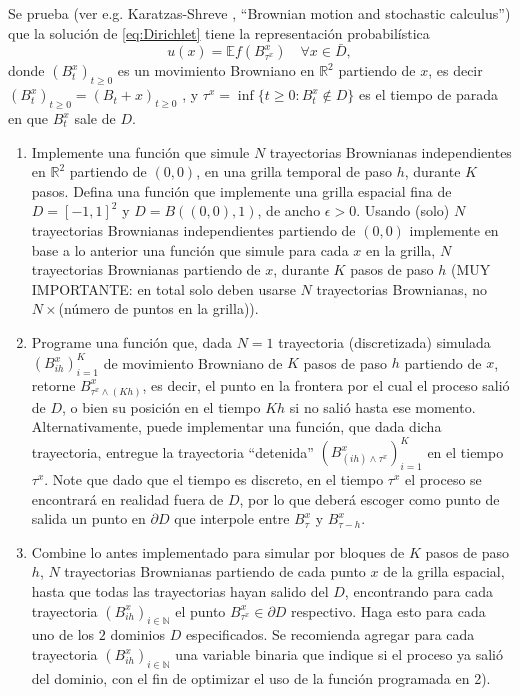 Se prueba (ver e.g. Karatzas-Shreve , ``Brownian motion and stochastic calculus'')  que la solución de \eqref{eq:Dirichlet} tiene la  representaci\'on probabilística 
\begin{equation}
\label{eq:u}
u(x) = \mathbb{E} f(B^x_{\tau^x}) \quad \forall x\in \bar{D},
\end{equation}
donde $(B^x_t)_{t\geq 0}$ es un movimiento Browniano en $\mathbb{R}^2$ partiendo de $x$,  es decir $(B^x_t)_{t\geq 0} = (B_t+x)_{t\geq 0}$ , y  $\tau^x = \inf\{t\geq 0: B^x_t \notin D\}$ es el tiempo de parada en que $B^x_t$  sale de $D$. 
\begin{enumerate}
\item Implemente una funci\'on que simule $N$ trayectorias Brownianas independientes en $\mathbb{R}^2$ partiendo de $(0,0)$, en una grilla temporal de paso $h$, durante $K$ pasos. Defina una  funci\'on que implemente una grilla espacial fina de $D=[-1,1]^2$ y $D=B((0,0), 1)$, de ancho $\epsilon>0$. Usando (solo) $N$ trayectorias  Brownianas  independientes partiendo  de $(0,0)$    implemente en base a lo anterior una funci\'on que  simule  para cada $x$ en la grilla, $N$  trayectorias Brownianas partiendo de  $x$, durante $K$ pasos  de paso $h$ (MUY IMPORTANTE:  en total solo deben usarse $N$ trayectorias Brownianas, no $N\times $(n\'umero de puntos en la grilla)). 

\item Programe una funci\'on que, dada $N=1$ trayectoria (discretizada)  simulada  $(B^x_{ih})_{i=1}^K$ de movimiento Browniano de $K$ pasos de paso $h$ partiendo de $x$, retorne $B^x_{\tau^x \wedge (Kh)}$, es decir,  el punto  en la frontera por el cual el proceso sali\'o  de $D$, o bien su posici\'on en el tiempo $Kh$ si no sali\'o hasta ese momento.  Alternativamente, puede implementar una funci\'on, que dada dicha trayectoria, entregue la trayectoria ``detenida''   $(B^x_{(ih) \wedge \tau^x})_{i=1}^K$ en el tiempo  $\tau^x$.   Note que dado que el tiempo es discreto, en el tiempo $\tau^x$ el proceso se encontrar\'a en realidad fuera de $D$,  por lo que deber\'a  escoger  como punto de salida  un punto  en $\partial D$ que interpole entre $B^x_{\tau}$ y $B^x_{\tau-h}$. 

 \item Combine lo antes implementado para simular por bloques de $K$ pasos de paso $h$,  $N$ trayectorias Brownianas partiendo de cada punto $x$ de la grilla espacial, hasta que todas las trayectorias hayan salido del $D$, encontrando para cada  trayectoria $(B^x_{ih})_{i\in \mathbb{N}}$ el punto $B^x_{\tau^x} \in \partial D$ respectivo.   Haga esto para cada uno de los $2$ dominios $D$ especificados.  Se recomienda agregar para cada trayectoria   $(B^x_{ih})_{i\in \mathbb{N}}$    una variable binaria que indique si el proceso ya sali\'o del  dominio, con el fin de optimizar  el uso de la funci\'on programada en 2). 
  

\end{enumerate}
